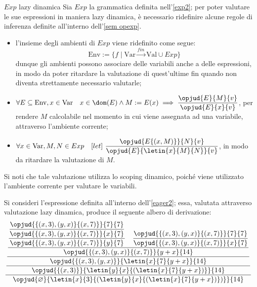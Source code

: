 \documentclass[a4paper, 12pt]{report}
\begin{document}
    \begin{framedobs}{$Exp$ lazy dinamica}
        Sia $Exp$ la grammatica definita nell'\cref{exp2}; per poter valutare le sue espressioni in maniera lazy dinamica, è necessario ridefinire alcune regole di inferenza definite all'interno dell'\cref{sem opexp}.

        \begin{itemize}
            \item l'insieme degli ambienti di $Exp$ viene ridefinito come segue: $$\mathrm{Env} := \{f \mid \mathrm{Var} \xrightarrow{fin} \mathrm{Val} \cup Exp\}$$ dunque gli ambienti possono associare delle variabili anche a delle espressioni, in modo da poter ritardare la valutazione di quest'ultime fin quando non diventa strettamente necessario valutarle;
            \item $\forall E \subseteq \mathrm{Env}, x \in \mathrm{Var} \quad x \in \dom(E) \land M := E(x) \implies \dfrac{\opjud{E}{M}{v}}{\opjud{E}{x}{v}}$, per rendere $M$ calcolabile nel momento in cui viene assegnata ad una variabile, attraverso l'ambiente corrente;
            \item $\forall x \in \mathrm{Var}, M, N \in Exp \quad [let] \ \dfrac{\opjud{E\{(x, M)\}}{N}{v}}{\opjud{E}{\letin{x}{M}{N}}{v}}$, in modo da ritardare la valutazione di $M$.
        \end{itemize}

        Si noti che tale valutazione utilizza lo scoping dinamico, poiché viene utilizzato l'ambiente corrente per valutare le variabili.
    \end{framedobs}

    \begin{example}
        Si consideri l'espressione definita all'interno dell'\cref{eager2}; essa, valutata attraverso valutazione lazy dinamica, produce il seguente albero di derivazione: $$\dfrac{\dfrac{\dfrac{\dfrac{\dfrac{\dfrac{\opjud{\{(x,3),(y,x)\}\{(x,7)\}}{7}{7}}{\opjud{\{(x,3),(y,x)\}\{(x,7)\}}{x}{7}}}{\opjud{\{(x,3),(y,x)\}\{(x,7)\}}{y}{7}} \quad \dfrac{\opjud{\{(x,3),(y,x)\}\{(x,7)\}}{7}{7}}{\opjud{\{(x,3),(y,x)\}\{(x,7)\}}{x}{7}}}{\opjud{\{(x,3),(y,x)\}\{(x,7)\}}{y+x}{14}}}{\opjud{\{(x,3),(y,x)\}}{\letin{x}{7}{y+x}}{14}}}{\opjud{\{(x,3)\}}{\letin{y}{x}{(\letin{x}{7}{y+x})}}{14}}}{\opjud{\varnothing}{\letin{x}{3}{(\letin{y}{x}{(\letin{x}{7}{y+x})})}}{14}}$$
    \end{example}
\end{document}

